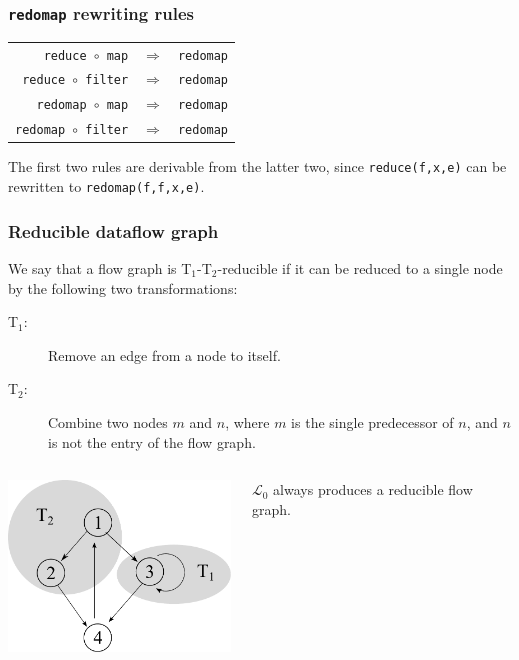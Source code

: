 \documentclass{beamer}
\newcommand{\LO}{$\mathcal{L}_0$}
\begin{document}
\begin{frame}
  \frametitle{\texttt{redomap} rewriting rules}

  \begin{center}
    \begin{tabular}{rcl}
      \texttt{reduce $\circ$ map}    & $\Rightarrow$ & \texttt{redomap} \\
      \texttt{reduce $\circ$ filter}    & $\Rightarrow$ & \texttt{redomap} \\
      \texttt{redomap $\circ$ map}    & $\Rightarrow$ & \texttt{redomap} \\
      \texttt{redomap $\circ$ filter}    & $\Rightarrow$ & \texttt{redomap} \\
    \end{tabular}
  \end{center}

  The first two rules are derivable from the latter two, since
  \texttt{reduce(f,x,e)} can be rewritten to \texttt{redomap(f,f,x,e)}.

\end{frame}

\begin{frame}
  \frametitle{Reducible dataflow graph}

  We say that a flow graph is T$_{1}$-T$_{2}$-reducible if it can be
  reduced to a single node by the following two transformations:

  \begin{description}
  \item[T$_{1}$:] Remove an edge from a node to itself.

  \item[T$_{2}$:] Combine two nodes $m$ and $n$, where $m$ is the
    single predecessor of $n$, and $n$ is not the entry of the flow
    graph.
  \end{description}

  \begin{columns}
    \begin{column}{6cm}
      \includegraphics[width=6cm]{img/t1t2.pdf}\hfill
    \end{column}
    \begin{column}{4cm}
      \LO{} always produces a reducible flow graph.
    \end{column}
  \end{columns}

\end{frame}
\end{document}
